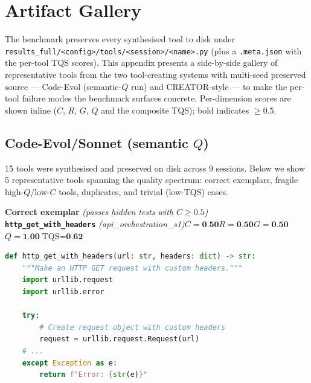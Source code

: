 \onecolumn
\appendix
\section{Artifact Gallery}
\label{app:artifact_gallery}

The benchmark preserves every synthesised tool to disk under
\texttt{results\_full/<config>/tools/<session>/<name>.py} (plus a
\texttt{.meta.json} with the per-tool TQS scores). This appendix presents
a side-by-side gallery of representative tools from the two
tool-creating systems with multi-seed preserved source --- Code-Evol
(semantic-$Q$ run) and CREATOR-style --- to make the per-tool failure
modes the benchmark surfaces concrete. Per-dimension scores are shown
inline ($C$, $R$, $G$, $Q$ and the composite TQS); bold indicates
$\geq 0.5$.

\subsection{Code-Evol/Sonnet (semantic $Q$)}

15 tools were synthesised and preserved on disk across 9 sessions.
Below we show 5 representative tools spanning the quality
spectrum: correct exemplars, fragile high-$Q$/low-$C$ tools, duplicates,
and trivial (low-TQS) cases.

\noindent \textbf{Correct exemplar} \textit{(passes hidden tests with $C{\geq}0.5$)}\\
    \texttt{\textbf{http\_get\_with\_headers}} \footnotesize\textit{(api\_orchestration\_s1)}\quad $C{=}\textbf{0.50}$\;$R{=}\textbf{0.50}$\;$G{=}\textbf{0.50}$\;$Q{=}\textbf{1.00}$\;$\text{TQS}{=}\textbf{0.62}$
    \begin{lstlisting}[basicstyle=\scriptsize\ttfamily,language=Python,frame=none,xleftmargin=1em,breaklines=true,postbreak=\mbox{\textcolor{gray}{$\hookrightarrow$}\space},showstringspaces=false]
def http_get_with_headers(url: str, headers: dict) -> str:
    """Make an HTTP GET request with custom headers."""
    import urllib.request
    import urllib.error

    try:
        # Create request object with custom headers
        request = urllib.request.Request(url)
    # ...
    except Exception as e:
        return f"Error: {str(e)}"
\end{lstlisting}
    \vspace{0.8em}

